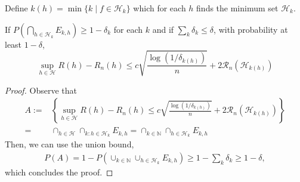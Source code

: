 \begin{theorem}
Define $k(h) = \min \{k \mid f \in \mathcal{H}_k\}$ which for each $h$ finds the minimum set $\mathcal{H}_k$.

If $P(\bigcap_{h \in \mathcal{H}_k} E_{k, h} ) \geq 1 - \delta_k$ for each $k$ and if $\sum_k \delta_k \leq \delta$, with probability at least $1 - \delta$,
$$
\sup _{h \in \mathcal{H}} R(h)-R_{n}(h) \leq c \sqrt{\frac{\log \left(1 / \delta_{k(h)}\right)}{n}}+2 \mathcal{R}_{n}\left(\mathcal{H}_{k(h)}\right)
$$
\end{theorem}
\begin{proof}
Observe that
\begin{align*}
A := & \left\{\sup _{h \in \mathcal{H}} R(h)-R_{n}(h) \leq c \sqrt{\frac{\log \left(1 / \delta_{k(h)}\right)}{n}}+2 \mathcal{R}_{n}\left(\mathcal{H}_{k(h)}\right)\right\} \\
=& \cap_{h \in \mathcal{H}} \cap_{k: h \in \mathcal{H}_{k}} E_{k, h}=\cap_{k \in \mathbb{N}} \cap_{h \in \mathcal{H}_{k}} E_{k, h}
\end{align*}
Then, we can use the union bound,
\begin{align*}
    P(A)=1-P\left(\cup_{k \in \mathbb{N}} \cup_{h \in \mathcal{H}_{k}} E_{k, h}\right) \geq 1-\sum_{k} \delta_{k} \geq 1-\delta,
\end{align*}
which concludes the proof.
\end{proof}

